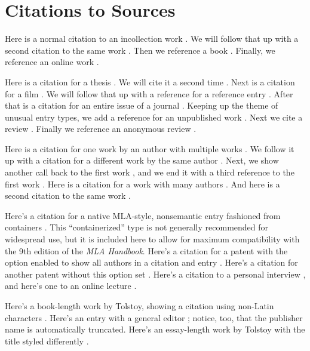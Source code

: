 \documentclass{article}
\begin{document}
\section{Citations to Sources}
Here is a normal citation to an incollection work \autocite[7]{haggis99aa}. We will follow that up with a second citation to the same work \autocite[8]{haggis99aa}. Then we reference a book \autocite[194]{public08aa}. Finally, we reference an online work \autocite{Grammar-Girl2008}.

Here is a citation for a thesis \autocite[22]{webb84aa}. We will cite it a second time \autocite[23]{webb84aa}. Next is a citation for a film \autocite{jhabvala85aa}. We will follow that up with a reference for a reference entry \autocite{reference-noon89aa}. After that is a citation for an entire issue of a journal \autocite{appiah92aa}. Keeping up the theme of unusual entry types, we add a reference for an unpublished work \autocite{salviatiXXaa}. Next we cite a review \autocite[224]{slater01aa}. Finally we reference an anonymous review \autocite[785]{danish1972aa}.

Here is a citation for one work by an author with multiple works \autocite[12]{askme06aa}. We follow it up with a citation for a different work by the same author \autocite[34]{askme92aa}. Next, we show another call back to the first work \autocite[45]{askme06aa}, and we end it with a third reference to the first work \autocite[56]{askme06aa}. Here is a citation for a work with many authors \autocite[34]{Babich:2011dg}. And here is a second citation to the same work \autocite[32]{Babich:2011dg}.

Here's a citation for a native MLA-style, nonsemantic entry fashioned from containers \autocite{mla:shaw}. This ``containerized'' type is not generally recommended for widespread use, but it is included here to allow for maximum compatibility with the 9th edition of the \emph{MLA Handbook}. Here's a citation for a patent with the option enabled to show all authors in a citation and entry \autocite[12]{sorace}. Here's a citation for another patent without this option set \autocite[102]{laufenberg}. Here's a citation to a personal interview \autocite{misc:smith}, and here's one to an online lecture \autocite{elkm}.

Here's a book-length work by Tolstoy, showing a citation using non-Latin characters \autocite[22]{tolstoy:kreutzer}. Here's an entry with a general editor \autocite{crane69ab}; notice, too, that the publisher name is automatically truncated. Here's an essay-length work by Tolstoy with the title styled differently \autocite[22]{tolstoy:readers}. 
\end{document}
